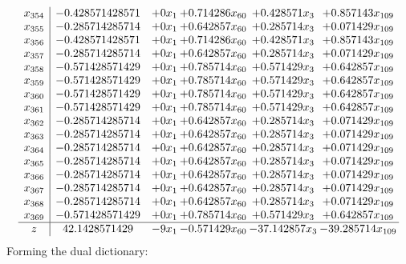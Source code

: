\documentclass[11pt]{article}
\begin{document}
\[\begin{array}{c| c c@{\hskip 2pt} c@{\hskip 2pt} c@{\hskip 2pt} c@{\hskip 2pt} }
 x_{354}   &  -0.428571428571 & + 0 x_{1} & + 0.714286 x_{60} & + 0.428571 x_{3} & + 0.857143 x_{109}\\
 x_{355}   &  -0.285714285714 & + 0 x_{1} & + 0.642857 x_{60} & + 0.285714 x_{3} & + 0.071429 x_{109}\\
 x_{356}   &  -0.428571428571 & + 0 x_{1} & + 0.714286 x_{60} & + 0.428571 x_{3} & + 0.857143 x_{109}\\
 x_{357}   &  -0.285714285714 & + 0 x_{1} & + 0.642857 x_{60} & + 0.285714 x_{3} & + 0.071429 x_{109}\\
 x_{358}   &  -0.571428571429 & + 0 x_{1} & + 0.785714 x_{60} & + 0.571429 x_{3} & + 0.642857 x_{109}\\
 x_{359}   &  -0.571428571429 & + 0 x_{1} & + 0.785714 x_{60} & + 0.571429 x_{3} & + 0.642857 x_{109}\\
 x_{360}   &  -0.571428571429 & + 0 x_{1} & + 0.785714 x_{60} & + 0.571429 x_{3} & + 0.642857 x_{109}\\
 x_{361}   &  -0.571428571429 & + 0 x_{1} & + 0.785714 x_{60} & + 0.571429 x_{3} & + 0.642857 x_{109}\\
 x_{362}   &  -0.285714285714 & + 0 x_{1} & + 0.642857 x_{60} & + 0.285714 x_{3} & + 0.071429 x_{109}\\
 x_{363}   &  -0.285714285714 & + 0 x_{1} & + 0.642857 x_{60} & + 0.285714 x_{3} & + 0.071429 x_{109}\\
 x_{364}   &  -0.285714285714 & + 0 x_{1} & + 0.642857 x_{60} & + 0.285714 x_{3} & + 0.071429 x_{109}\\
 x_{365}   &  -0.285714285714 & + 0 x_{1} & + 0.642857 x_{60} & + 0.285714 x_{3} & + 0.071429 x_{109}\\
 x_{366}   &  -0.285714285714 & + 0 x_{1} & + 0.642857 x_{60} & + 0.285714 x_{3} & + 0.071429 x_{109}\\
 x_{367}   &  -0.285714285714 & + 0 x_{1} & + 0.642857 x_{60} & + 0.285714 x_{3} & + 0.071429 x_{109}\\
 x_{368}   &  -0.285714285714 & + 0 x_{1} & + 0.642857 x_{60} & + 0.285714 x_{3} & + 0.071429 x_{109}\\
 x_{369}   &  -0.571428571429 & + 0 x_{1} & + 0.785714 x_{60} & + 0.571429 x_{3} & + 0.642857 x_{109}\\
\hline
z    &  42.1428571429 & -9 x_{1} & -0.571429 x_{60} & -37.142857 x_{3} & -39.285714 x_{109}\\
\end{array}\]
Forming the dual dictionary:
\end{document}
